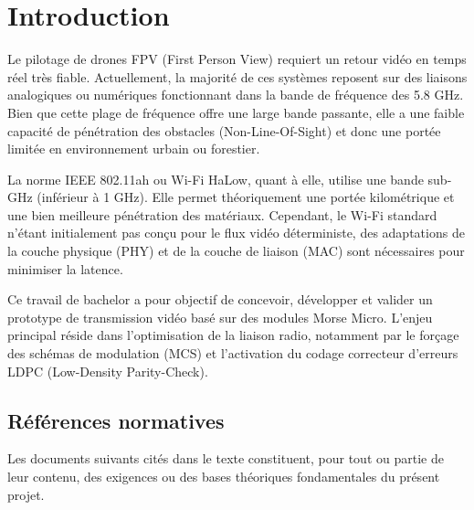 \section{Introduction}
Le pilotage de drones FPV (First Person View) requiert un retour vidéo en temps 
réel très fiable. Actuellement, la majorité de ces systèmes reposent sur des liaisons 
analogiques ou numériques fonctionnant dans la bande de fréquence des 5.8 GHz. Bien que cette plage de fréquence offre une 
large bande passante, elle a une faible capacité de pénétration des obstacles (Non-Line-Of-Sight) et
donc une portée limitée en environnement urbain ou forestier.

La norme IEEE 802.11ah ou Wi-Fi HaLow, quant à elle, utilise une bande 
sub-GHz (inférieur à 1 GHz). Elle permet théoriquement une portée kilométrique et une bien meilleure pénétration des 
matériaux. Cependant, le Wi-Fi standard n'étant initialement pas conçu pour le flux vidéo 
déterministe, des adaptations de la couche physique (PHY) et de la couche de liaison (MAC) sont 
nécessaires pour minimiser la latence.

Ce travail de bachelor a pour objectif de concevoir, développer et valider un prototype de transmission 
vidéo basé sur des modules Morse Micro. L'enjeu principal réside dans l'optimisation de la 
liaison radio, notamment par le forçage des schémas de modulation (MCS) et l'activation du codage correcteur 
d'erreurs LDPC (Low-Density Parity-Check).

\subsection{Références normatives}
Les documents suivants cités dans le texte constituent, pour tout ou partie de leur contenu, des 
exigences ou des bases théoriques fondamentales du présent projet.

\vspace{0.5cm}


